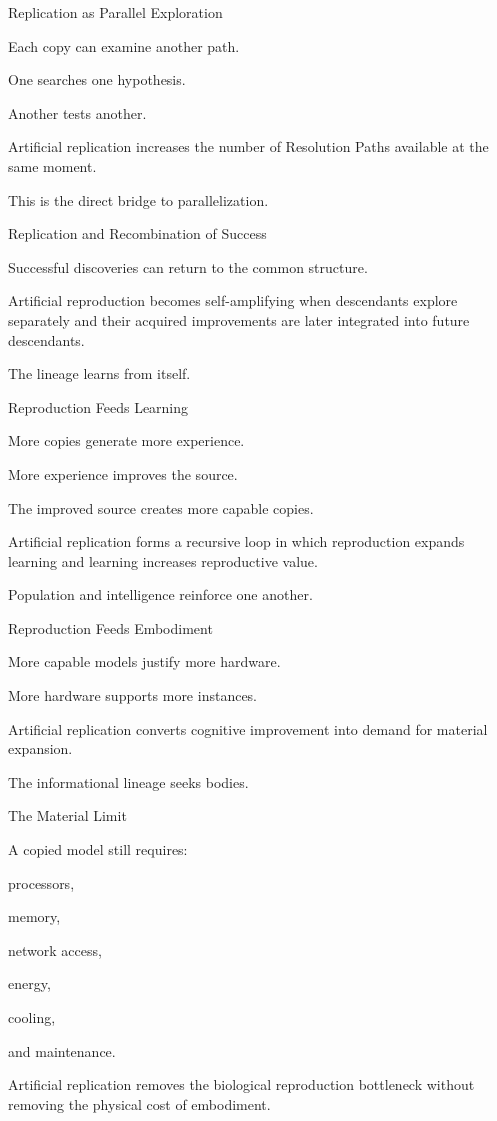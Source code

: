 Replication as Parallel Exploration

Each copy can examine another path.

One searches one hypothesis.

Another tests another.

Artificial replication increases the number of Resolution Paths available at the same moment.

This is the direct bridge to parallelization.

Replication and Recombination of Success

Successful discoveries can return to the common structure.

Artificial reproduction becomes self-amplifying when descendants explore separately and their acquired improvements are later integrated into future descendants.

The lineage learns from itself.

Reproduction Feeds Learning

More copies generate more experience.

More experience improves the source.

The improved source creates more capable copies.

Artificial replication forms a recursive loop in which reproduction expands learning and learning increases reproductive value.

Population and intelligence reinforce one another.

Reproduction Feeds Embodiment

More capable models justify more hardware.

More hardware supports more instances.

Artificial replication converts cognitive improvement into demand for material expansion.

The informational lineage seeks bodies.

The Material Limit

A copied model still requires:

processors,

memory,

network access,

energy,

cooling,

and maintenance.

Artificial replication removes the biological reproduction bottleneck without removing the physical cost of embodiment.

